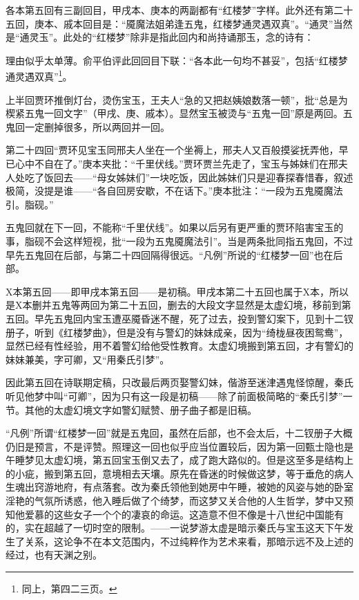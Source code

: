 \par 各本第五回有三副回目，甲戌本、庚本的两副都有“红楼梦”字样。此外还有第二十五回，庚本、戚本回目是：“魇魔法姐弟逢五鬼，红楼梦通灵遇双真”。“通灵”当然是“通灵玉”。此处的“红楼梦”除非是指此回内和尚持诵那玉，念的诗有：
\par 理由似乎太单薄。俞平伯评此回回目下联：“各本此一句均不甚妥”，包括“红楼梦通灵遇双真”\footnote{同上，第四二三页。}。
\par 上半回贾环推倒灯台，烫伤宝玉，王夫人“急的又把赵姨娘数落一顿”，批“总是为楔紧五鬼一回文字”（甲戌、庚、戚本）。显然宝玉被烫与“五鬼一回”原是两回。五鬼回一定删掉很多，所以两回并一回。
\par 第二十四回“贾环见宝玉同邢夫人坐在一个坐褥上，邢夫人又百般摸娑抚弄他，早已心中不自在了。”庚本夹批：“千里伏线。”贾环贾兰先走了，宝玉与姊妹们在邢夫人处吃了饭回去——“母女姊妹们”一块吃饭，因此姊妹们只是迎春探春惜春，叙述极简，没提是谁——“各自回房安歇，不在话下。”庚本批注：“一段为五鬼魇魔法引。脂砚。”
\par 五鬼回就在下一回，不能称“千里伏线”。如果以后另有更严重的贾环陷害宝玉的事，脂砚不会这样短视，批“一段为五鬼魇魔法引”。当是两条批同指五鬼回，不过早先五鬼回在后部，与第二十四回隔得很远。“凡例”所说的“红楼梦一回”也在后部。
\par X本第五回——即甲戌本第五回——是初稿。甲戌本第二十五回也属于X本，所以是X本删并五鬼等两回为第二十五回，删去的大段文字显然是太虚幻境，移前到第五回。早先五鬼回内宝玉遭巫魇昏迷不醒，死了过去，投到警幻案下，见到十二钗册子，听到《红楼梦曲》，但是没有与警幻的妹妹成亲，因为“绮栊昼夜困鸳鸯”，显然已经有性经验，用不着警幻给他受性教育。太虚幻境搬到第五回，才有警幻的妹妹兼美，字可卿，又“用秦氏引梦”。
\par 因此第五回在诗联期定稿，只改最后两页娶警幻妹，偕游至迷津遇鬼怪惊醒，秦氏听见他梦中叫“可卿”，因为只有这一段是初稿——除了前面极简略的“秦氏引梦”一节。其他的太虚幻境文字如警幻赋赞、册子曲子都是旧稿。
\par “凡例”所谓“红楼梦一回”就是五鬼回，虽然在后部，也不会太后，十二钗册子大概仍旧是预言，不是评赞。照理这一回也似乎应当位置较后，因为第一回甄士隐也是午睡梦见太虚幻境，第五回宝玉倒又去了，成了跑大路似的。但是这至多是结构上的小疵，搬到第五回，意境相去天壤。原先在昏迷的时候做这梦，等于垂危的病人生魂出窍游地府，有点落套。改为秦氏领他到她房中午睡，被她的风姿与她的卧室淫艳的气氛所诱惑，他入睡后做了个绮梦，而这梦又关合他的人生哲学，梦中又预知他爱慕的这些女子一个个的凄哀的命运。这造意不但不像是十八世纪中国能有的，实在超越了一切时空的限制。——一说梦游太虚是暗示秦氏与宝玉这天下午发生了关系，这论争不在本文范围内，不过纯粹作为艺术来看，那暗示远不及上述的经过，也有天渊之别。

